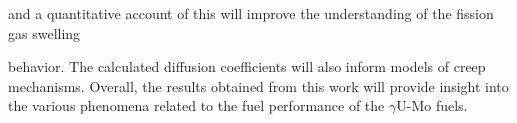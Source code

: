 \documentclass{elsarticle}
\providecommand{\DIFadd}[1]{{\protect\color{blue} \sf #1}} %
\providecommand{\DIFdel}[1]{}
\providecommand{\DIFaddbegin}{} %
\providecommand{\DIFaddend}{} %
\providecommand{\DIFdelbegin}{} %
\providecommand{\DIFdelend}{} %
\begin{document}
\DIFadd{and a quantitative account of this will improve }\DIFaddend the understanding of \DIFaddbegin \DIFadd{the }\DIFaddend fission gas swelling \DIFdelbegin \DIFdel{behaviors. }%

\DIFdel{The diffusion coefficients obtained from this work can be used to model the mesoscale behavior of $\gamma$U-Mo fuels. The diffusivity values can }\DIFdelend \DIFaddbegin \DIFadd{behavior. The calculated diffusion coefficients will }\DIFaddend also inform models of \DIFdelbegin \DIFdel{various creep mechanisms, such as Coble creep. Also, these values can be utilized to understand }\DIFdelend \DIFaddbegin \DIFadd{creep mechanisms. Overall, the results obtained from this work will provide insight into the various }\DIFaddend phenomena related to \DIFdelbegin \DIFdel{fuel performance, such as intergranular fission gas swelling}\DIFdelend \DIFaddbegin \DIFadd{the fuel performance of the $\gamma$U-Mo fuels}\DIFaddend .
\end{document}

